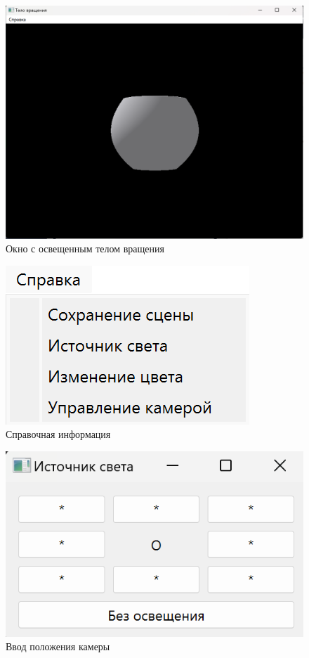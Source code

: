 \begin{figure}[H]
    \centering
    \includegraphics[width=0.8\linewidth]{images/interface/light_body.png}
    \caption{Окно с освещенным телом вращения}
    \label{fig:interface3}
\end{figure}

\begin{figure}[H]
    \centering
    \includegraphics[width=0.8\linewidth]{images/interface/info.png}
    \caption{Справочная информация}
    \label{fig:interface4}
\end{figure}

\begin{figure}[H]
    \centering
    \includegraphics[width=0.8\linewidth]{images/interface/light_input.png}
    \caption{Ввод положения камеры}
    \label{fig:interface6}
\end{figure}
